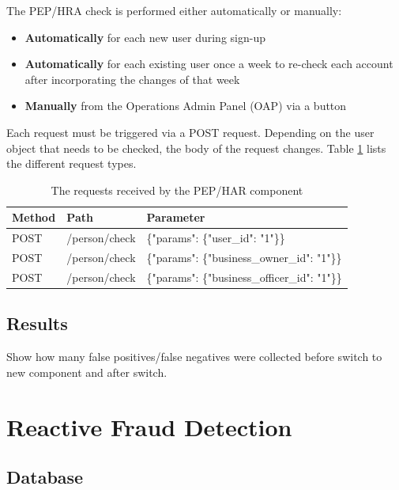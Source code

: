 \documentclass[a4paper, oneside]{csthesis}
\begin{document}
The PEP/HRA check is performed either automatically or manually:
\begin{itemize}
\item \textbf{Automatically} for each new user during sign-up
\item \textbf{Automatically} for each existing user once a week to re-check each account after incorporating the changes of that week
\item \textbf{Manually} from the Operations Admin Panel (OAP) via a button
\end{itemize}

Each request must be triggered via a POST request. Depending on the user object that needs to be checked, the body of the request changes. Table \ref{tbl:har-pep-requests} lists the different request types.

\begin{table}[tb]
    \begin{center}
        \begin{tabular}{p{1.75cm}|p{3cm}p{7cm}}
        \hline
        \textbf{Method} & \textbf{Path} & \textbf{Parameter} \\
        \hline
        POST & /person/check & \{"params": \{"user\_id": "1"\}\} \\ \hdashline[0.5pt/3pt]
        POST & /person/check & \{"params": \{"business\_owner\_id": "1"\}\} \\ \hdashline[0.5pt/3pt]
        POST & /person/check & \{"params": \{"business\_officer\_id": "1"\}\} \\
        \hline
        \end{tabular}
    \end{center}
    \label{tbl:har-pep-requests}
    \caption{The requests received by the PEP/HAR component}
\end{table}

\subsection{Results}

Show how many false positives/false negatives were collected before switch to new component and after switch.




\section{Reactive Fraud Detection}
\label{sec:exp-reactive}

\subsection{Database}
\end{document}
